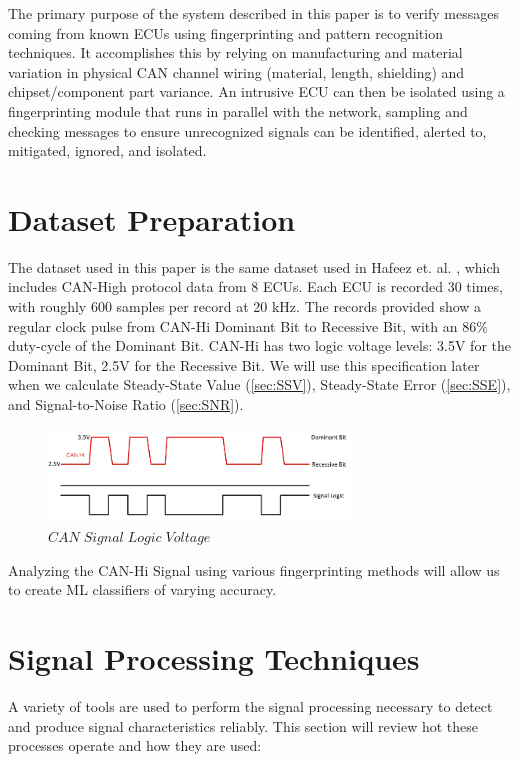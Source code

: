 \documentclass[conference]{IEEEtran}
\begin{document}
The primary purpose of the system described in this paper is to verify messages coming from known ECUs using fingerprinting and pattern recognition techniques. It accomplishes this by relying on manufacturing and material variation in physical CAN channel wiring (material, length, shielding) and chipset/component part variance. An intrusive ECU can then be isolated using a fingerprinting module that runs in parallel with the network, sampling and checking messages to ensure unrecognized signals can be identified, alerted to, mitigated, ignored, and isolated.

\section{Dataset Preparation}

The dataset used in this paper is the same dataset used in Hafeez et. al. \cite{hafeez2019}, which includes CAN-High protocol data from 8 ECUs. Each ECU is recorded 30 times, with roughly 600 samples per record at 20 kHz. The records provided show a regular clock pulse from CAN-Hi Dominant Bit to Recessive Bit, with an 86\% duty-cycle of the Dominant Bit. CAN-Hi has two logic voltage levels: 3.5V for the Dominant Bit, 2.5V for the Recessive Bit. We will use this specification later when we calculate Steady-State Value (\ref{sec:SSV}), Steady-State Error (\ref{sec:SSE}), and Signal-to-Noise Ratio (\ref{sec:SNR}).

\begin{figure}[htb]
\centering
\includegraphics[width=3.2in]{figures/02_can_hi.png}
\caption{$CAN  \; Signal \; Logic  \; Voltage$}
\label{fig:CANBitLogic}
\end{figure}

Analyzing the CAN-Hi Signal using various fingerprinting methods will allow us to create ML classifiers of varying accuracy.

\section{Signal Processing Techniques}

A variety of tools are used to perform the signal processing necessary to detect and produce signal characteristics reliably. This section will review hot these processes operate and how they are used:
\end{document}
